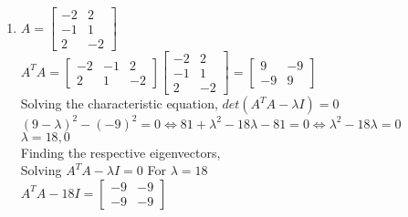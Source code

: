 \documentclass[12pt]{article}
\begin{document}
\begin{enumerate}[label=(\alph*)]
\begin{proof}
$$\implies U\Sigma V^T = \begin{bmatrix} \sigma_{1}u_1 & \sigma_{2}u_2 & ... & \sigma_{r}u_r & (0)u_{r+1} & ... & (0)u_n\end{bmatrix} \begin{bmatrix} v_1^T \\ v_2^T \\ ... \\ v_r^T \\ v_{r+1}^T \\ ... \\ v_n^T\end{bmatrix} $$

$$\implies U\Sigma V^T = \sigma_{1}u_1v_1^T + \sigma_{2}u_2v_2^T + ... + \sigma_{r}u_rv_r^T + (0)u_{r+1}v_{r+1}^T + ... + (0)u_nv_n^T $$

$$ \implies A = U\Sigma V^T = \sigma_{1}u_1v_1^T + \sigma_{2}u_2v_2^T + ... + \sigma_{r}u_rv_r^T$$
\end{proof}

\item $ A = \begin{bmatrix}
    -2 & 2 \\
    -1 & 1 \\ 
    2 & -2 
\end{bmatrix} $ \\

$A^TA = \begin{bmatrix}
    -2 & -1 & 2 \\ 
    2 & 1 & -2
\end{bmatrix}\begin{bmatrix}
    -2 & 2 \\
    -1 & 1 \\ 
    2 & -2 
\end{bmatrix} = \begin{bmatrix}
    9 & -9 \\ 
    -9 & 9
\end{bmatrix}$ \\

Solving the characteristic equation, $det(A^TA - \lambda I) = 0$ \\
$(9-\lambda)^2 - (-9)^2 = 0 \iff 81 + \lambda^2 -18\lambda - 81 = 0 \iff \lambda^2 - 18\lambda = 0$ \\
$\lambda = 18,0$ \\
Finding the respective eigenvectors, \\
Solving $A^TA - \lambda I = 0$
For $\lambda = 18$ \\
$A^TA - 18I = \begin{bmatrix}
    -9 & -9 \\ 
    -9 & -9
\end{bmatrix} $\\


\end{enumerate}
\end{document}

